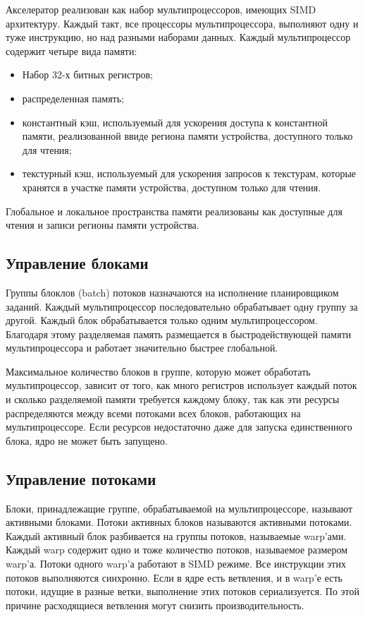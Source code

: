 Акселератор реализован как набор мультипроцессоров, имеющих SIMD архитектуру. Каждый такт, все процессоры мультипроцессора, выполняют одну и туже инструкцию, но над разными наборами данных. Каждый мультипроцессор содержит четыре вида памяти:

\begin{itemize}
\item Набор 32-х битных регистров;

\item распределенная память;

\item константный кэш, используемый для ускорения доступа к константной памяти, реализованной ввиде региона памяти устройства, доступного только для чтения;

\item текстурный кэш, используемый для ускорения запросов к текстурам, которые хранятся в участке памяти устройства, доступном только для чтения.
\end{itemize}

Глобальное и локальное пространства памяти реализованы как доступные для чтения и записи регионы памяти устройства.

\subsection{Управление блоками}
Группы блоклов (batch) потоков назначаются на исполнение планировщиком заданий. Каждый мультипроцессор последовательно обрабатывает одну группу за другой. Каждый блок обрабатывается только одним мультипроцессором. Благодаря этому разделяемая память размещается в быстродействующей памяти мультипроцессора и работает значительно быстрее глобальной.

Максимальное количество блоков в группе, которую может обработать мультипроцессор, зависит от того, как много регистров использует каждый поток и сколько разделяемой памяти требуется каждому блоку, так как эти ресурсы распределяются между всеми потоками всех блоков, работающих на мультипроцессоре. Если ресурсов недостаточно даже для запуска единственного блока, ядро не может быть запущено.

\subsection{Управление потоками}
Блоки, принадлежащие группе, обрабатываемой на мультипроцессоре, называют активными блоками. Потоки активных блоков называются активными потоками. Каждый активный блок разбивается на группы потоков, называемые warp'ами. Каждый warp содержит одно и тоже количество потоков, называемое размером warp'а. Потоки одного warp'а работают в SIMD режиме. Все инструкции этих потоков выполняются синхронно. Если в ядре есть ветвления, и в warp'е есть потоки, идущие в разные ветки, выполнение этих потоков сериализуется. По этой причине расходящиеся ветвления могут снизить производительность.

